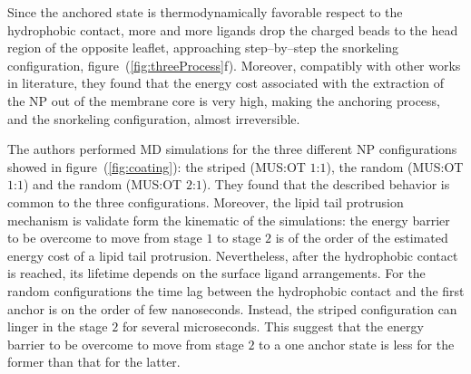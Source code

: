 Since the anchored state is thermodynamically favorable respect to the hydrophobic contact, more and more ligands drop the charged beads to the head region of the opposite leaflet, approaching step--by--step the snorkeling configuration, figure~(\ref{fig:threeProcess}f). Moreover, compatibly with other works in literature, they found that the energy cost associated with the extraction of the \ac{NP} out of the membrane core is very high, making the anchoring process, and the snorkeling configuration, almost irreversible.
 
\bigskip
The authors performed \ac{MD} simulations for the three different \ac{NP} configurations showed in figure~(\ref{fig:coating}): the striped (\ac{MUS}:\ac{OT} $1$:$1$), the random (\ac{MUS}:\ac{OT} $1$:$1$) and the random (\ac{MUS}:\ac{OT} $2$:$1$). They found that the described behavior is common to the three configurations. Moreover, the lipid tail protrusion mechanism is validate form the kinematic of the simulations: the energy barrier to be overcome to move from stage $1$ to stage $2$ is of the order of the estimated energy cost of a lipid tail protrusion. Nevertheless, after the hydrophobic contact is reached, its lifetime depends on the surface ligand arrangements. For the random configurations the time lag between the hydrophobic contact and the first anchor is on the order of few nanoseconds. Instead, the striped configuration can linger in the stage $2$ for several microseconds. This suggest that the energy barrier to be overcome to move from stage $2$ to a one anchor state is less for the former than that for the latter. 

